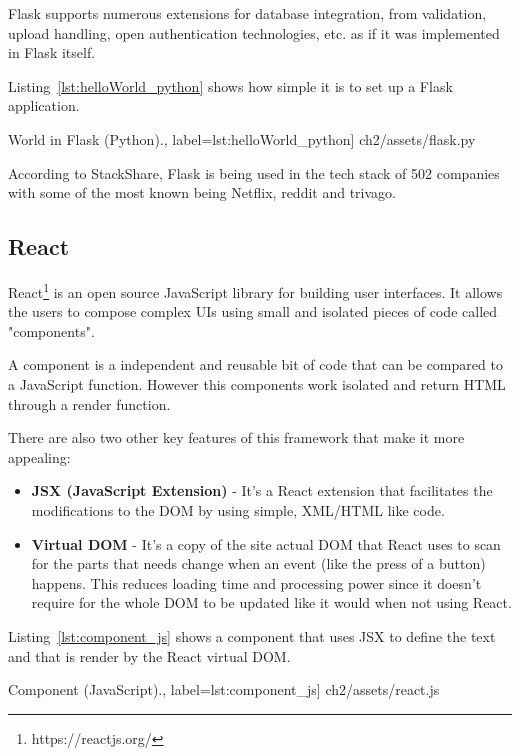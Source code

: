 Flask supports numerous extensions for database integration, from validation, upload handling, open authentication technologies, etc. as if it was implemented in Flask itself.

Listing~\ref{lst:helloWorld_python} shows how simple it is to set up a Flask application.

\begin{center}
\begin{minipage}{0.95\linewidth}
 World in Flask (Python).,
label=lst:helloWorld_python]
{ch2/assets/flask.py}
\end{minipage}
\end{center}

According to StackShare\cite{flask2020Stack}, Flask is being used in the tech stack of 502 companies with some of the most known being Netflix, reddit and trivago.

\subsection{React}

React\footnote{https://reactjs.org/} is an open source JavaScript library for building user interfaces.
It allows the users to compose complex UIs using small and isolated pieces of code called "components".

A component is a independent and reusable bit of code that can be compared to a JavaScript function.
However this components work isolated and return HTML through a render function.

There are also two other key features of this framework that make it more appealing:
\begin{itemize}
    \item \textbf{JSX (JavaScript Extension)} - It's a React extension that facilitates the modifications to the DOM by using simple, XML/HTML like code.
    \item \textbf{Virtual DOM} - It's a copy of the site actual DOM that React uses to scan for the parts that needs change when an event (like the press of a button) happens.
        This reduces loading time and processing power since it doesn't require for the whole DOM to be updated like it would when not using React.
\end{itemize}

Listing~\ref{lst:component_js} shows a component that uses JSX to define the text and that is render by the React virtual DOM.

\begin{center}
\begin{minipage}{0.95\linewidth}
 Component (JavaScript).,
label=lst:component_js]
{ch2/assets/react.js}
\end{minipage}
\end{center}

